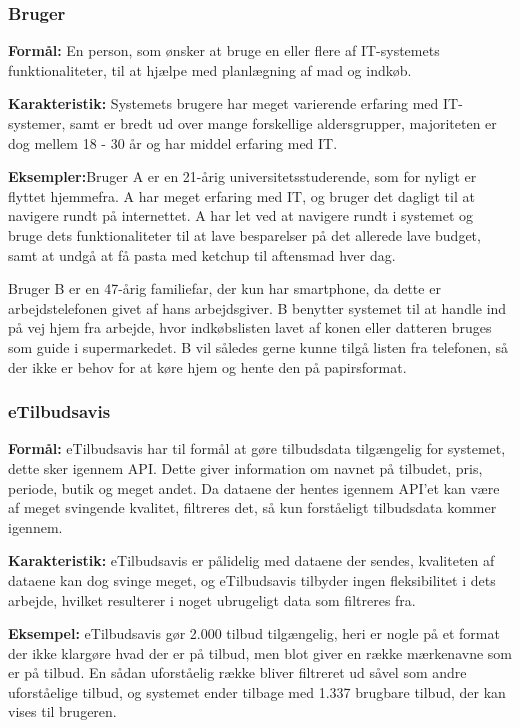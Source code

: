\subsubsection*{Bruger}

\textbf{Formål:} En person, som ønsker at bruge en eller flere af IT-systemets funktionaliteter, til at hjælpe med planlægning af mad og indkøb.

\textbf{Karakteristik:} Systemets brugere har meget varierende erfaring med IT-systemer, samt er bredt ud over mange forskellige aldersgrupper, majoriteten er dog mellem 18 - 30 år og har middel erfaring med IT.

\textbf{Eksempler:}Bruger A er en 21-årig universitetsstuderende, som for nyligt er flyttet hjemmefra. A har meget erfaring med IT, og bruger det dagligt til at navigere rundt på internettet.
A har let ved at navigere rundt i systemet og bruge dets funktionaliteter til at lave besparelser på det allerede lave budget, samt at undgå at få pasta med ketchup til aftensmad hver dag.

Bruger B er en 47-årig familiefar, der kun har smartphone, da dette er arbejdstelefonen givet af hans arbejdsgiver.
B benytter systemet til at handle ind på vej hjem fra arbejde, hvor indkøbslisten lavet af konen eller datteren bruges som guide i supermarkedet.
B vil således gerne kunne tilgå listen fra telefonen, så der ikke er behov for at køre hjem og hente den på papirsformat.

\subsubsection*{eTilbudsavis}

\textbf{Formål:} eTilbudsavis har til formål at gøre tilbudsdata tilgængelig for systemet, dette sker igennem API.
Dette giver information om navnet på tilbudet, pris, periode, butik og meget andet.
Da dataene der hentes igennem API'et kan være af meget svingende kvalitet, filtreres det, så kun forståeligt tilbudsdata kommer igennem.

\textbf{Karakteristik:} eTilbudsavis er pålidelig med dataene der sendes, kvaliteten af dataene kan dog svinge meget, og eTilbudsavis tilbyder ingen fleksibilitet i dets arbejde, hvilket resulterer i noget ubrugeligt data som filtreres fra.

\textbf{Eksempel:} eTilbudsavis gør 2.000 tilbud tilgængelig, heri er nogle på et format der ikke klargøre hvad der er på tilbud, men blot giver en række mærkenavne som er på tilbud.
En sådan uforståelig række bliver filtreret ud såvel som andre uforståelige tilbud, og systemet ender tilbage med 1.337 brugbare tilbud, der kan vises til brugeren.

